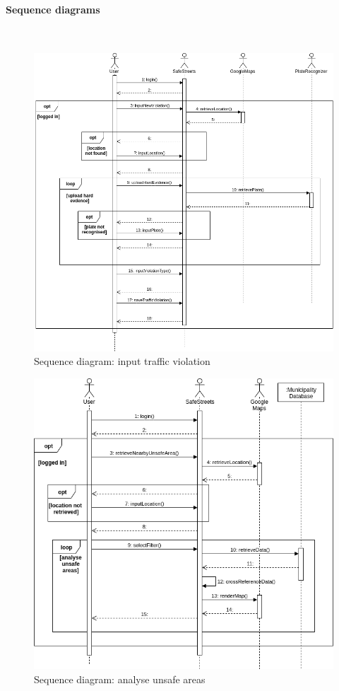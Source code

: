 \documentclass{article}
\begin{document}
\paragraph{Sequence diagrams}\mbox{}\\
\begin{figure}[H]
    \centering
    \includegraphics[scale=0.45]{Images/SequenceReportViolation}
    \caption{Sequence diagram: input traffic violation}
\end{figure}

\begin{figure}[H]
    \centering
    \includegraphics[scale=0.5]{Images/SequenceUserAnalyseUnsafeAreas} 
    \caption{Sequence diagram: analyse unsafe areas}
\end{figure}
\newpage
\end{document}
